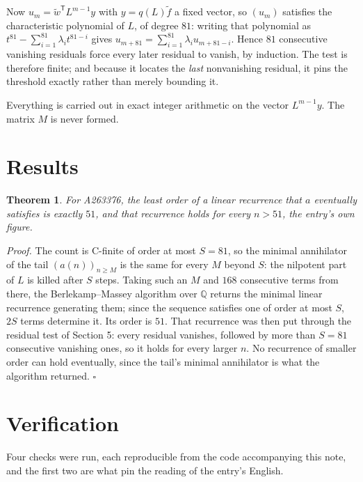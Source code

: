 \documentclass[11pt]{article}
\newtheorem{theorem}{Theorem}
\theoremstyle{definition}
\begin{document}
Now $u_m = \tilde w^{\mathsf T} L^{m-1} y$ with $y = q(L)\tilde f$ a fixed vector, so $(u_m)$ satisfies the characteristic polynomial of $L$, of degree $81$: writing that polynomial as $t^{81} - \sum_{i=1}^{81} \lambda_i t^{81-i}$ gives $u_{m+81} = \sum_{i=1}^{81} \lambda_i u_{m+81-i}$. Hence $81$ consecutive vanishing residuals force every later residual to vanish, by induction. The test is therefore finite; and because it locates the {\itshape last} nonvanishing residual, it pins the threshold exactly rather than merely bounding it.

Everything is carried out in exact integer arithmetic on the vector $L^{m-1}y$. The matrix $M$ is never formed.

\section{Results}

\begin{theorem} For A263376, the least order of a linear recurrence that $a$ eventually satisfies is exactly $51$, and that recurrence holds for every $n > 51$, the entry's own figure.\end{theorem}

{\itshape Proof.} The count is C-finite of order at most $S = 81$, so the minimal annihilator of the tail $(a(n))_{n \ge M}$ is the same for every $M$ beyond $S$: the nilpotent part of $L$ is killed after $S$ steps. Taking such an $M$ and $168$ consecutive terms from there, the Berlekamp--Massey algorithm over $\mathbb{Q}$ returns the minimal linear recurrence generating them; since the sequence satisfies one of order at most $S$, $2S$ terms determine it. Its order is $51$. That recurrence was then put through the residual test of Section 5: every residual vanishes, followed by more than $S = 81$ consecutive vanishing ones, so it holds for every larger $n$. No recurrence of smaller order can hold eventually, since the tail's minimal annihilator is what the algorithm returned. $\square$

\section{Verification}

Four checks were run, each reproducible from the code accompanying this note, and the first two are what pin the reading of the entry's English.
\end{document}
